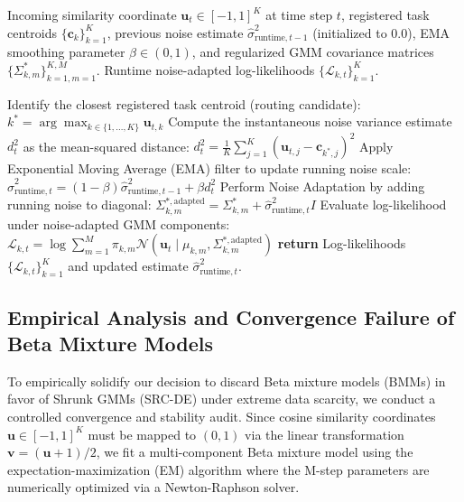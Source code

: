 \documentclass{article}
\theoremstyle{plain}
\theoremstyle{definition}
\theoremstyle{remark}
\begin{document}
\begin{algorithm}[tb]
   \caption{Dynamic Runtime Coordinate Noise Estimation and Adaptation}
   \label{alg:dynamic_noise}
\begin{algorithmic}[1]
    Incoming similarity coordinate $\mathbf{u}_t \in [-1, 1]^K$ at time step $t$, registered task centroids $\{\mathbf{c}_k\}_{k=1}^K$, previous noise estimate $\hat{\sigma}^2_{\text{runtime}, t-1}$ (initialized to $0.0$), EMA smoothing parameter $\beta \in (0, 1)$, and regularized GMM covariance matrices $\{\Sigma^{*}_{k, m}\}_{k=1, m=1}^{K, M}$.
    Runtime noise-adapted log-likelihoods $\{\mathcal{L}_{k, t}\}_{k=1}^K$.
   
   \STATE Identify the closest registered task centroid (routing candidate):
   \STATE \quad $k^* = \arg\max_{k \in \{1, \dots, K\}} \mathbf{u}_{t, k}$
   \STATE Compute the instantaneous noise variance estimate $d_t^2$ as the mean-squared distance:
   \STATE \quad $d_t^2 = \frac{1}{K} \sum_{j=1}^K (\mathbf{u}_{t, j} - \mathbf{c}_{k^*, j})^2$
   \STATE Apply Exponential Moving Average (EMA) filter to update running noise scale:
   \STATE \quad $\hat{\sigma}^2_{\text{runtime}, t} = (1 - \beta) \hat{\sigma}^2_{\text{runtime}, t-1} + \beta d_t^2$
           \STATE Perform Noise Adaptation by adding running noise to diagonal:
           \STATE \quad $\Sigma^{*,\text{adapted}}_{k, m} = \Sigma^{*}_{k, m} + \hat{\sigma}^2_{\text{runtime}, t} I$
       \ENDFOR
       \STATE Evaluate log-likelihood under noise-adapted GMM components:
       \STATE \quad $\mathcal{L}_{k, t} = \log \sum_{m=1}^M \pi_{k, m} \mathcal{N}(\mathbf{u}_t \mid \mu_{k, m}, \Sigma^{*,\text{adapted}}_{k, m})$
   \ENDFOR
   \STATE \textbf{return} Log-likelihoods $\{\mathcal{L}_{k, t}\}_{k=1}^K$ and updated estimate $\hat{\sigma}^2_{\text{runtime}, t}$.
\end{algorithmic}
\end{algorithm}

\subsection{Empirical Analysis and Convergence Failure of Beta Mixture Models}
To empirically solidify our decision to discard Beta mixture models (BMMs) in favor of Shrunk GMMs (SRC-DE) under extreme data scarcity, we conduct a controlled convergence and stability audit. Since cosine similarity coordinates $\mathbf{u} \in [-1, 1]^K$ must be mapped to $(0, 1)$ via the linear transformation $\mathbf{v} = (\mathbf{u} + 1) / 2$, we fit a multi-component Beta mixture model using the expectation-maximization (EM) algorithm where the M-step parameters are numerically optimized via a Newton-Raphson solver.
\end{document}
